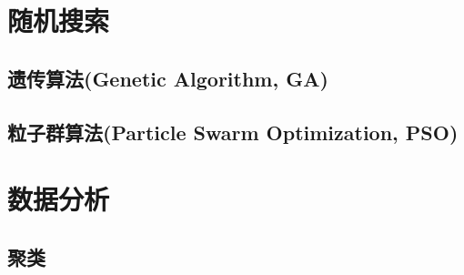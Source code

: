 \documentclass{book}
\begin{document}
\chapter{随机搜索}
\section{遗传算法(Genetic Algorithm, GA)}
\section{粒子群算法(Particle Swarm Optimization, PSO)}

\chapter{数据分析}
\section{聚类}
\end{document}
